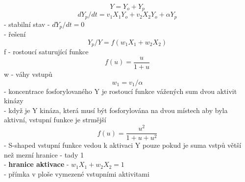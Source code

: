 \documentclass[11pt,a4paper]{report}
\begin{document}
\begin{equation}
Y=Y_o+Y_p
\end{equation}
\begin{equation}
dY_p/dt=v_1X_1Y_o+v_2X_2Y_o+\alpha Y_p
\end{equation}
- stabilní stav - $dY_p/dt=0$\\
- řešení\\
\begin{equation}
Y_p/Y=f(w_1X_1+w_2X_2)
\end{equation}
\indent f - rostoucí saturující funkce\\
\begin{equation}
f(u)=\frac{u}{1+u}
\end{equation}
\indent w - váhy vstupů\\
\begin{equation}
w_1=v_1/\alpha
\end{equation}
- koncentrace fosforylovaného Y je rostoucí funkce vážených sum dvou aktivit kinázy\\
- když je Y kináza, která musí být fosforylována na dvou místech aby byla aktivní, vstupní funkce je strmější\\
\begin{equation}
f(u)=\frac{u^2}{1+u+u^2}
\end{equation}
- S-shaped vstupní funkce vedou k aktivaci Y pouze pokud je suma vstpů větší než mezní hranice - tady 1\\
- \textbf{hranice aktivace} - $w_1X_1+w_2X_2=1$\\
\indent - přímka v ploše vymezené vstupními aktivitami
\end{document}
